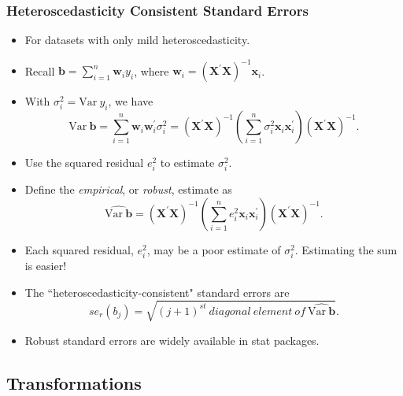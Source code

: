 \begin{frame}%
 \frametitle{Heteroscedasticity Consistent Standard Errors}
 \begin{itemize}
   \item For datasets with only mild heteroscedasticity.
\item Recall $ \mathbf{b} = \sum_{i=1}^n \mathbf{w}_i y_i $,
where $\mathbf{w}_i =\left(
\mathbf{X}^{\prime}\mathbf{X}\right)^{-1} \mathbf{x}_i$.
\item With $\sigma_i^2 = \mathrm{Var~} y_i$, we have
\begin{equation*}
\mathrm{Var~}\mathbf{b} = \sum_{i=1}^n \mathbf{w}_i
\mathbf{w}_i^{\prime} \sigma_i^2  =\left(
\mathbf{X}^{\prime}\mathbf{X}\right)^{-1} \left( \sum_{i=1}^n
\sigma_i^2 \mathbf{x}_i \mathbf{x}_i^{\prime} \right) \left(
\mathbf{X}^{\prime}\mathbf{X}\right)^{-1}.
\end{equation*}
\item Use the
squared residual $e_i^2$ to estimate $\sigma_i^2$.
\item Define the \emph{empirical}, or \emph{robust}, estimate as
\begin{equation*}
\widehat{\mathrm{Var~}\mathbf{b}} =\left(
\mathbf{X}^{\prime}\mathbf{X}\right)^{-1} \left( \sum_{i=1}^n e_i^2
\mathbf{x}_i \mathbf{x}_i^{\prime} \right) \left(
\mathbf{X}^{\prime}\mathbf{X}\right)^{-1}.
\end{equation*}
\item Each squared residual,
$e_i^2$, may be a poor estimate of $\sigma_i^2$. Estimating the sum
is easier!
\item The  ``heteroscedasticity-consistent" standard
errors are
\begin{equation*}
se_r(b_j) = \sqrt{(j+1)^{st} ~diagonal~
element~of~\widehat{\mathrm{Var~}\mathbf{b}}}.
\end{equation*}
\item Robust standard errors are widely available in stat packages.
    \end{itemize}
\end{frame}

\subsection{Transformations}


